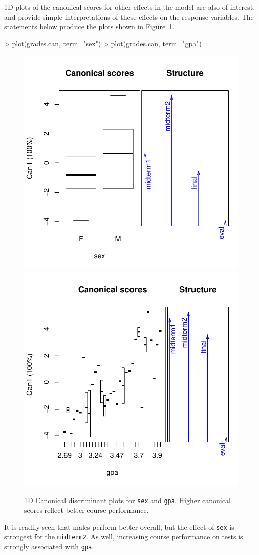 \documentclass[11pt]{article}
\newcommand{\figref}[1]{Figure~\ref{#1}}
\newcommand{\code}[1]{{\texttt{#1}}}
\begin{document}
1D plots of the canonical scores for other effects in the model are also of
interest, and provide simple interpretations of these effects on the response
variables.  The statements below produce the plots shown in \figref{fig:grades-can1}.  
\begin{Schunk}
\begin{Sinput}
> plot(grades.can, term="sex")
> plot(grades.can, term="gpa")
\end{Sinput}
\end{Schunk}
\begin{figure}[htb!]
\begin{center}
	\includegraphics[width=.48\textwidth]{fig/plot-grades-can-sex}
	\includegraphics[width=.48\textwidth]{fig/plot-grades-can-gpa}
\caption{1D Canonical discriminant plots for \code{sex} and \code{gpa}.
	Higher canonical scores reflect better course performance.}
\label{fig:grades-can1}
\end{center}
\end{figure}
It is readily seen that males perform better overall, but the effect of
\code{sex} is strongest for the \code{midterm2}.
As well, increasing course performance on tests is strongly associated with
\code{gpa}.  



%

\end{document}
